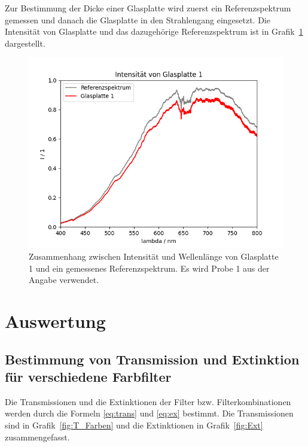\documentclass{article}
\begin{document}
Zur Bestimmung der Dicke einer Glasplatte wird zuerst ein Referenzspektrum gemessen und danach die Glasplatte in den Strahlengang eingesetzt. Die Intensität von Glasplatte und das dazugehörige Referenzspektrum ist in Grafik~\ref{fig:I_glas_1} dargestellt.


\begin{figure}[H]
\centering
\caption{Zusammenhang zwischen Intensität und Wellenlänge von Glasplatte 1 und ein gemessenes Referenzspektrum. Es wird Probe 1 aus der Angabe verwendet.}
\label{fig:I_glas_1}
\includegraphics[scale=0.7]{GP_Intensitaet_1.png}
\end{figure}






\section{Auswertung}

\subsection{Bestimmung von Transmission und Extinktion für verschiedene Farbfilter}

Die Transmissionen und die Extinktionen der Filter bzw. Filterkombinationen werden durch die Formeln \eqref{eq:trans} und \eqref{eq:ex} bestimmt. Die Transmissionen sind in Grafik~\ref{fig:T_Farben} und die Extinktionen in Grafik~\ref{fig:Ext} zusammengefasst.
\end{document}
